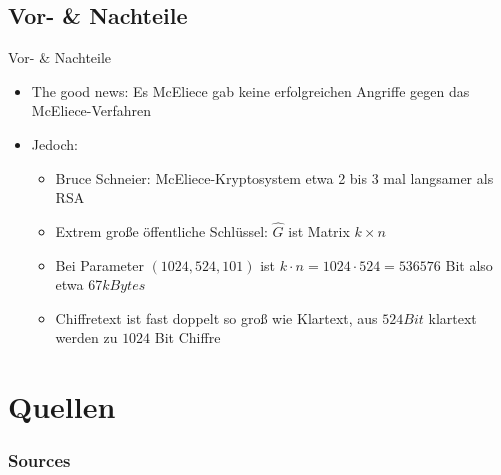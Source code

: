 \documentclass[11pt%
,aspectratio=169%
]{beamer}
\begin{document}
\subsection{Vor- \& Nachteile}
\begin{frame}{Vor- \& Nachteile}
    \begin{itemize}
        \item The good news: Es McEliece gab keine erfolgreichen Angriffe gegen das McEliece-Verfahren 
        \item Jedoch:
        \begin{itemize}
            \item Bruce Schneier: McEliece-Kryptosystem etwa 2 bis 3 mal langsamer als RSA \cite[S. 479ff]{Schneier2007Applied}
            \item Extrem große öffentliche Schlüssel: $\hat{G}$ ist Matrix $k \times n$
            \item Bei Parameter $(1024,524,101)$ ist $k \cdot n = 1024 \cdot 524 = 536576$ Bit also etwa 67$kBytes$
            \item Chiffretext ist fast doppelt so groß wie Klartext, aus $524 Bit$ klartext werden zu $1024$ Bit Chiffre 
        \end{itemize}
     \end{itemize}
\end{frame}

\section{Quellen}
\appendix
\begin{frame}[allowframebreaks]
  \frametitle<presentation>{Sources}


\end{frame}
\end{document}
